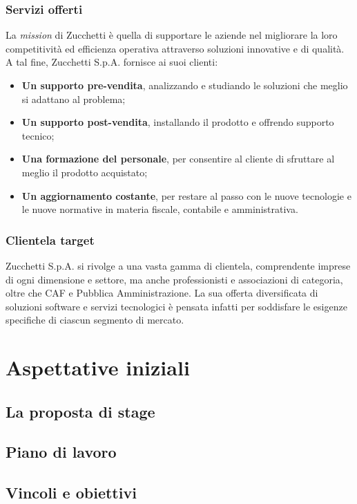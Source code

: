\subsubsection{Servizi offerti}
La \emph{mission} di Zucchetti è quella di supportare le aziende nel migliorare
la loro competitività ed efficienza operativa attraverso soluzioni innovative e 
di qualità.
A tal fine, Zucchetti S.p.A. fornisce ai suoi clienti:
\begin{itemize}
    \item \textbf{Un supporto pre-vendita}, analizzando e studiando le soluzioni 
    che meglio si adattano al problema;
    \item \textbf{Un supporto post-vendita}, installando il prodotto e 
    offrendo supporto tecnico;
    \item \textbf{Una formazione del personale}, per consentire al cliente di 
    sfruttare al meglio il prodotto acquistato;
    \item \textbf{Un aggiornamento costante}, per restare al passo con le nuove
    tecnologie e le nuove normative in materia fiscale, contabile e amministrativa.
\end{itemize} 

\subsubsection{Clientela target}
Zucchetti S.p.A. si rivolge a una vasta gamma di clientela, comprendente imprese
di ogni dimensione e settore, ma anche professionisti e associazioni di categoria, 
oltre che CAF e Pubblica Amministrazione. 
La sua offerta diversificata di soluzioni software e servizi tecnologici è pensata 
infatti per soddisfare le esigenze specifiche di ciascun segmento di mercato.


\section{Aspettative iniziali}
\subsection{La proposta di stage}

\subsection{Piano di lavoro}

\subsection{Vincoli e obiettivi}

